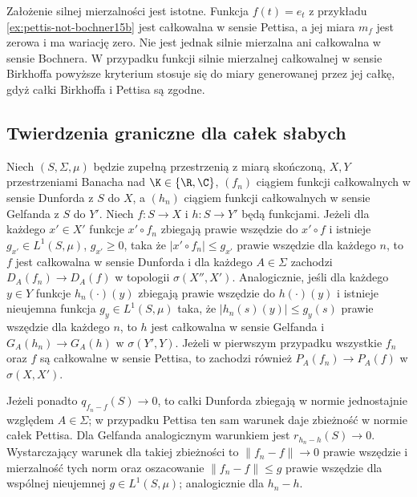 Założenie silnej mierzalności jest istotne.
Funkcja $f(t)=e_t$ z przykładu
\ref{ex:pettis-not-bochner15b} jest całkowalna
w sensie Pettisa, a jej miara $m_f$ jest zerowa
i ma wariację zero. Nie jest jednak silnie mierzalna
ani całkowalna w sensie Bochnera.
W przypadku funkcji silnie mierzalnej całkowalnej
w sensie Birkhoffa powyższe kryterium stosuje się
do miary generowanej przez jej całkę, gdyż całki
Birkhoffa i Pettisa są zgodne.

\subsection{Twierdzenia graniczne dla całek słabych}

\begin{twierdzenie}
\label{thm:vector-integral-convergence15b}
Niech $(S,\Sigma,\mu)$ będzie zupełną przestrzenią z miarą
skończoną, $X,Y$ przestrzeniami Banacha nad
$\K\in\{\R,\C\}$, $(f_n)$ ciągiem funkcji całkowalnych
w sensie Dunforda z $S$ do $X$, a $(h_n)$ ciągiem funkcji
całkowalnych w sensie Gelfanda z $S$ do $Y'$.
Niech $f:S\to X$ i $h:S\to Y'$ będą funkcjami.
Jeżeli dla każdego $x'\in X'$ funkcje $x'\circ f_n$
zbiegają prawie wszędzie do $x'\circ f$ i istnieje
$g_{x'}\in L^1(S,\mu)$, $g_{x'}\ge0$, taka że
$|x'\circ f_n|\le g_{x'}$ prawie wszędzie dla każdego $n$,
to $f$ jest całkowalna w sensie Dunforda i dla każdego
$A\in\Sigma$ zachodzi
$D_A(f_n)\to D_A(f)$ w topologii $\sigma(X'',X')$.
Analogicznie, jeśli dla każdego $y\in Y$ funkcje
$h_n(\cdot)(y)$ zbiegają prawie wszędzie do $h(\cdot)(y)$
i istnieje nieujemna funkcja $g_y\in L^1(S,\mu)$
taka, że $|h_n(s)(y)|\le g_y(s)$ prawie wszędzie dla
każdego $n$, to $h$ jest całkowalna w sensie
Gelfanda i $G_A(h_n)\to G_A(h)$ w $\sigma(Y',Y)$.
Jeżeli w pierwszym przypadku wszystkie $f_n$ oraz $f$
są całkowalne w sensie Pettisa, to zachodzi również
$P_A(f_n)\to P_A(f)$ w $\sigma(X,X')$.

Jeżeli ponadto $q_{f_n-f}(S)\to0$, to całki Dunforda
zbiegają w normie jednostajnie względem $A\in\Sigma$;
w przypadku Pettisa ten sam warunek daje zbieżność
w normie całek Pettisa. Dla Gelfanda analogicznym
warunkiem jest $r_{h_n-h}(S)\to0$.
Wystarczający warunek dla takiej zbieżności to
$\|f_n-f\|\to0$ prawie wszędzie i mierzalność tych norm
oraz oszacowanie $\|f_n-f\|\le g$ prawie wszędzie dla
wspólnej nieujemnej $g\in L^1(S,\mu)$; analogicznie dla
$h_n-h$.
\end{twierdzenie}
